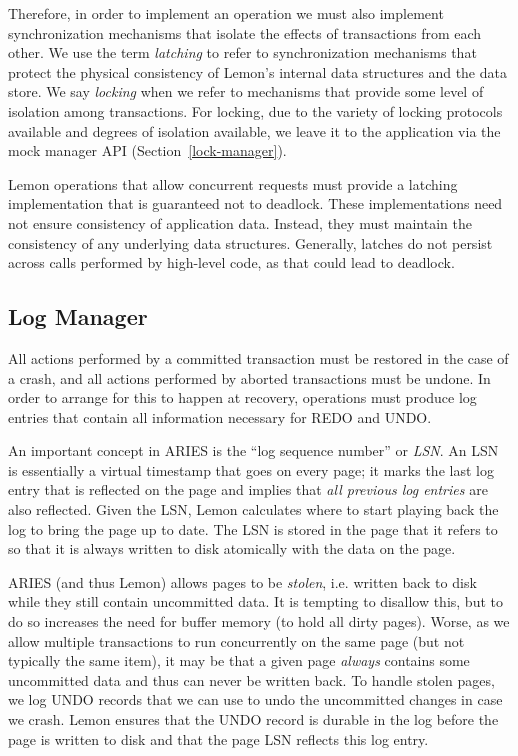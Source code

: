 \documentclass[10pt,letterpaper,twocolumn,english]{article}
\newcommand{\yad}{Lemon\xspace}
\begin{document}
Therefore, in order to implement an operation we must also implement
synchronization mechanisms that isolate the effects of transactions
from each other.  We use the term {\em latching} to refer to
synchronization mechanisms that protect the physical consistency of
\yad's internal data structures and the data store.  We say {\em
locking} when we refer to mechanisms that provide some level of
isolation among transactions.  
For locking, due to the variety of locking protocols available and degrees of isolation available, we leave it to the application via the mock manager API (Section~\ref{lock-manager}).


\yad operations that allow concurrent requests must provide a latching
implementation that is guaranteed not to deadlock.
These implementations need not ensure consistency of application data.
Instead, they must maintain the consistency of any underlying data
structures.  Generally, latches do not persist across calls performed
by high-level code, as that could lead to deadlock.





\subsection{Log Manager}
\label{log-manager}

All actions performed by a committed transaction must be
restored in the case of a crash, and all actions performed by aborted
transactions must be undone. In order to arrange for this
to happen at recovery, operations must produce log entries that contain
all information necessary for REDO and UNDO.

An important concept in ARIES is the ``log sequence number'' or {\em
LSN}.  An LSN is essentially a virtual timestamp that goes on every
page; it marks the last log entry that is reflected on the page and
implies that {\em all previous log entries} are also reflected.  Given the
LSN, \yad calculates where to start playing back the log to bring the
page up to date.  The LSN is stored in the page that it refers to so
that it is always written to disk atomically with the data on the
page.

ARIES (and thus \yad) allows pages to be {\em stolen}, i.e. written
back to disk while they still contain uncommitted data.  It is
tempting to disallow this, but to do so increases the need for buffer
memory (to hold all dirty pages). Worse, as we allow multiple
transactions to run concurrently on the same page (but not typically
the same item), it may be that a given page {\em always} contains some
uncommitted data and thus can never be written back.  To handle stolen
pages, we log UNDO records that we can use to undo the uncommitted
changes in case we crash.  \yad ensures that the UNDO record is
durable in the log before the page is written to disk and that the
page LSN reflects this log entry.
\end{document}
